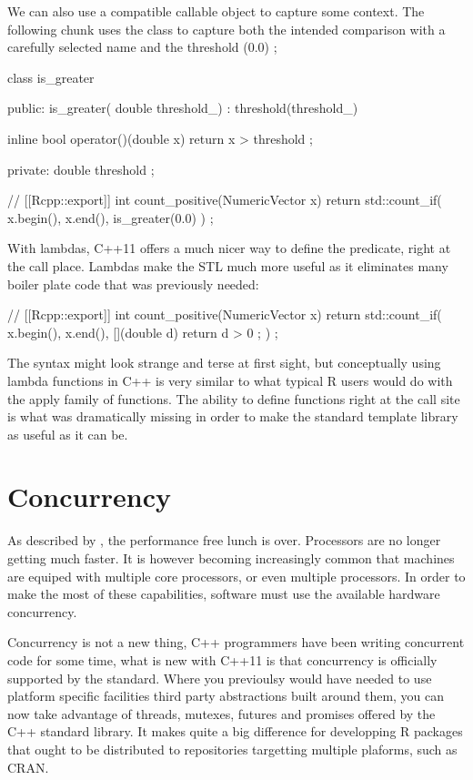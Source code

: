We can also use a compatible callable object to capture some context. The 
following chunk uses the  class to capture both the 
intended comparison with a carefully selected name and the threshold (0.0) ;

\begin{example}
class is_greater {
public:
  is_greater( double threshold_) : threshold(threshold_){}
  
  inline bool operator()(double x){
    return x > threshold ;
  }
  
private:
  double threshold ;
}
// [[Rcpp::export]]
int count_positive(NumericVector x){
  return std::count_if( x.begin(), x.end(), is_greater(0.0) ) ;
}
\end{example}

With lambdas, C++11 offers a much nicer way to define the predicate, right at the 
call place. Lambdas make the STL much more useful as it eliminates 
many boiler plate code that was previously needed:

\begin{example}
// [[Rcpp::export]]
int count_positive(NumericVector x){
  return std::count_if( x.begin(), x.end(), 
    [](double d){ return d > 0 ;}
  ) ;
}
\end{example}

The syntax might look strange and terse at first sight, but conceptually 
using lambda functions in C++ is very similar to what typical R users
would do with the apply family of functions. The ability to define 
functions right at the call site is what was dramatically missing in order
to make the standard template library as useful as it can be. 

\section{Concurrency}

As described by \citep{sutter2005}, the performance free lunch is over. Processors
are no longer getting much faster. It is however becoming 
increasingly common that machines are equiped with multiple core processors, or
even multiple processors. In order to make the most of these
capabilities, software must use the available hardware concurrency. 

Concurrency is not a new thing, C++ programmers have been writing concurrent
code for some time, what is new with C++11 is that concurrency 
is officially supported by the standard. Where you previoulsy 
would have needed to use platform specific facilities 
third party abstractions built around them, you can now take advantage
of threads, mutexes, futures and promises offered by the C++ standard 
library. It makes quite a big difference for developping 
R packages that ought to be distributed to repositories targetting 
multiple plaforms, such as CRAN. 

